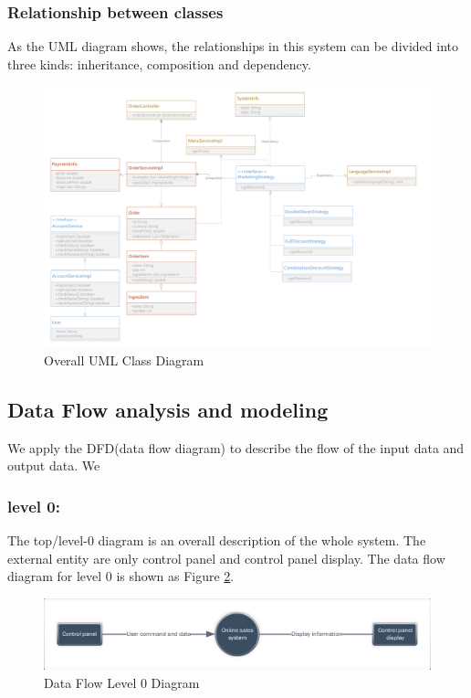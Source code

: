 \documentclass[a4paper]{report}
\begin{document}
\subsubsection{Relationship between classes}
As the UML diagram shows, the relationships in this system can be divided into three kinds: inheritance, composition and dependency.
\begin{figure}
  \centering
  \includegraphics[scale=0.38]{UMLClass.pdf}
  \caption{Overall UML Class Diagram}\label{4}
\end{figure}
\subsection{Data Flow analysis and modeling}
We apply the DFD(data flow diagram) to describe the flow of the input data and output data.
We 
\subsubsection{level 0:} The top/level-0 diagram is an overall description of the whole system. The external entity are only control panel and control panel display. The data flow diagram for level 0 is shown as Figure \ref{5}.
\begin{figure}
  \centering
  \includegraphics[scale=0.38]{DataFlowLevel0.pdf}
  \caption{Data Flow Level 0 Diagram}\label{5}
\end{figure}
\end{document}
